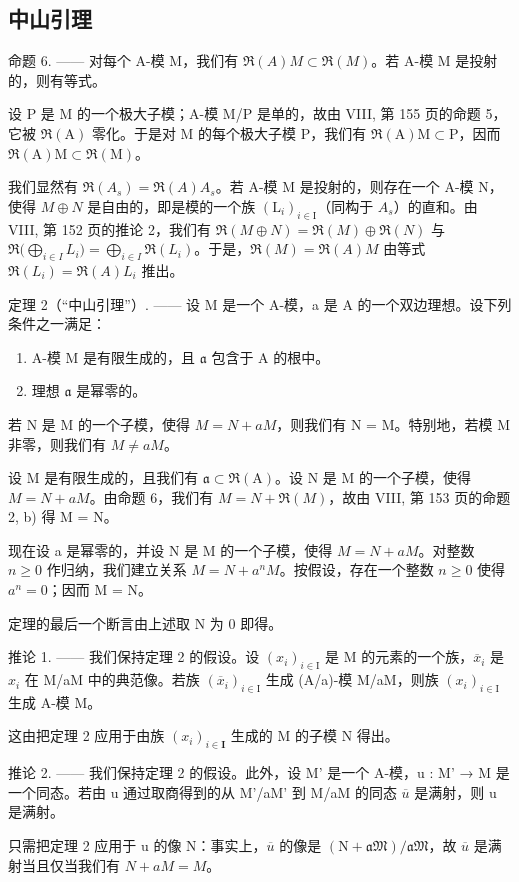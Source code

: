 \subsection{中山引理}

命题 6. —— 对每个 A-模 M，我们有 \(\Re(A)M \subset \Re(M)\)。若 A-模 M 是投射的，则有等式。

设 P 是 M 的一个极大子模；A-模 M/P 是单的，故由 VIII, 第 155 页的命题 5，它被 \(\Re(\mathrm{A})\) 零化。于是对 M 的每个极大子模 P，我们有 \(\Re(\mathrm{A})\mathrm{M}\subset\mathrm{P}\)，因而 \(\Re(\mathrm{A})\mathrm{M}\subset\Re(\mathrm{M})\)。

我们显然有 \(\mathfrak{R}(A_{s})=\mathfrak{R}(A)A_{s}\)。若 A-模 M 是投射的，则存在一个 A-模 N，使得 \(M\oplus N\) 是自由的，即是模的一个族 \((\mathrm{L}_{i})_{i\in\mathrm{I}}\)（同构于 \(A_{s}\)）的直和。由 VIII, 第 152 页的推论 2，我们有 \(\mathfrak{R}(M\oplus N)=\mathfrak{R}(M)\oplus\mathfrak{R}(N)\) 与 \(\mathfrak{R}\big(\bigoplus_{i\in I}L_{i}\big)=\bigoplus_{i\in I}\mathfrak{R}(L_{i})\)。于是，\(\mathfrak{R}(M)=\mathfrak{R}(A)M\) 由等式 \(\mathfrak{R}(L_{i})=\mathfrak{R}(A)L_{i}\) 推出。

定理 2（``中山引理''）. —— 设 M 是一个 A-模，a 是 A 的一个双边理想。设下列条件之一满足：

\begin{enumerate}
\def\labelenumi{(\roman{enumi})}
\item
  A-模 M 是有限生成的，且 \(\mathfrak{a}\) 包含于 A 的根中。
\item
  理想 \(\mathfrak{a}\) 是幂零的。
\end{enumerate}

若 N 是 M 的一个子模，使得 \(M = N + aM\)，则我们有 N = M。特别地，若模 M 非零，则我们有 \(M \neq aM\)。

设 M 是有限生成的，且我们有 \(\mathfrak{a} \subset \Re(\mathrm{A})\)。设 N 是 M 的一个子模，使得 \(M = N + aM\)。由命题 6，我们有 \(M = N + \Re(M)\)，故由 VIII, 第 153 页的命题 2, b) 得 M = N。

现在设 a 是幂零的，并设 N 是 M 的一个子模，使得 \(M = N + aM\)。对整数 \(n \geqslant 0\) 作归纳，我们建立关系 \(M = N + a^{n}M\)。按假设，存在一个整数 \(n \geqslant 0\) 使得 \(a^{n} = 0\)；因而 M = N。

定理的最后一个断言由上述取 N 为 0 即得。

推论 1. —— 我们保持定理 2 的假设。设 \((x_{i})_{i\in\mathrm{I}}\) 是 M 的元素的一个族，\(\overline{x}_{i}\) 是 \(x_{i}\) 在 M/aM 中的典范像。若族 \((\overline{x}_{i})_{i\in\mathrm{I}}\) 生成 (A/a)-模 M/aM，则族 \((x_{i})_{i\in\mathrm{I}}\) 生成 A-模 M。

这由把定理 2 应用于由族 \((x_{i})_{i\in \mathbf{I}}\) 生成的 M 的子模 N 得出。

推论 2. —— 我们保持定理 2 的假设。此外，设 M' 是一个 A-模，u : M' → M 是一个同态。若由 u 通过取商得到的从 M'/aM' 到 M/aM 的同态 \(\overline{u}\) 是满射，则 u 是满射。

只需把定理 2 应用于 u 的像 N：事实上，\(\overline{u}\) 的像是 \((\mathrm{N} + \mathfrak{aM})/\mathfrak{aM}\)，故 \(\overline{u}\) 是满射当且仅当我们有 \(N + aM = M\)。

